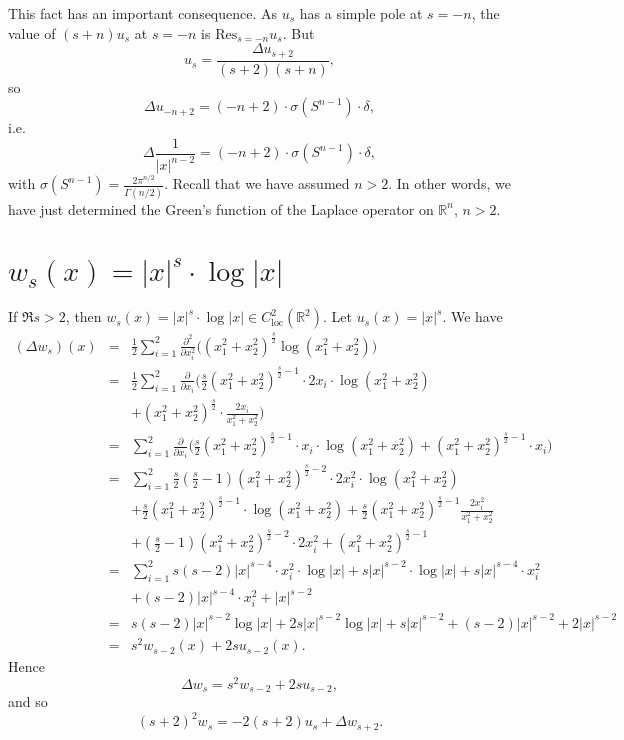 \documentclass{article}
\newcommand{\Res}{\textrm{Res}}
\begin{document}
This fact has an important consequence. As $u_s$ has a simple pole at $s=-n$, the value of $(s+n)u_s$ at $s=-n$ is $\Res_{s=-n} u_s$. 
But 
\[
u_s = \frac{\Delta u_{s+2}}{(s+2)(s+n)},
\]
so
\[
\Delta u_{-n+2}=(-n+2) \cdot \sigma(S^{n-1}) \cdot \delta,
\]
i.e.
\[
\Delta \frac{1}{|x|^{n-2}} = (-n+2) \cdot \sigma(S^{n-1}) \cdot \delta,
\]
with $\sigma(S^{n-1})=\frac{2\pi^{n/2}}{\Gamma(n/2)}$. Recall that we have assumed $n>2$.
In other words, we have just determined the Green's function of the Laplace operator on $\mathbb{R}^n$, $n>2$.



\section{$w_s(x)=|x|^s \cdot \log|x|$}
If $\Re s > 2$, then $w_s(x)=|x|^s \cdot \log|x| \in C^2_{\textrm{loc}}(\mathbb{R}^2)$. Let $u_s(x)=|x|^s$. 
We have
\begin{eqnarray*}
(\Delta w_s)(x)&=&\frac{1}{2}\sum_{i=1}^2 \frac{\partial^2}{\partial x_i^2}\Big( (x_1^2+x_2^2)^{\frac{s}{2}} \log ( x_1^2+x_2^2)\Big)\\
&=&\frac{1}{2}\sum_{i=1}^2 \frac{\partial}{\partial x_i}\Big( \frac{s}{2}(x_1^2+x_2^2)^{\frac{s}{2}-1} \cdot 2x_i \cdot \log ( x_1^2+x_2^2)\\
&&+(x_1^2+x_2^2)^{\frac{s}{2}} \cdot \frac{2x_i}{x_1^2+x_2^2} \Big)\\
&=&\sum_{i=1}^2  \frac{\partial}{\partial x_i}\Big( \frac{s}{2} (x_1^2+x_2^2)^{\frac{s}{2}-1} \cdot x_i \cdot \log ( x_1^2+x_2^2)+(x_1^2+x_2^2)^{\frac{s}{2}-1}\cdot x_i \Big)\\
&=&\sum_{i=1}^2 \frac{s}{2}\left(\frac{s}{2}-1\right)(x_1^2+x_2^2)^{\frac{s}{2}-2}  \cdot 2x_i^2 \cdot \log ( x_1^2+x_2^2)\\
&&+\frac{s}{2} (x_1^2+x_2^2)^{\frac{s}{2}-1} \cdot \log ( x_1^2+x_2^2)
+\frac{s}{2} (x_1^2+x_2^2)^{\frac{s}{2}-1} \frac{ 2x_i^2}{x_1^2+x_2^2}\\
&&+\left(\frac{s}{2}-1\right)(x_1^2+x_2^2)^{\frac{s}{2}-2}\cdot 2x_i^2 + (x_1^2+x_2^2)^{\frac{s}{2}-1}\\
&=&\sum_{i=1}^2 s(s-2) |x|^{s-4} \cdot x_i^2 \cdot \log |x|+s|x|^{s-2} \cdot \log|x|+s|x|^{s-4} \cdot x_i^2\\
&&+(s-2)|x|^{s-4}\cdot x_i^2+|x|^{s-2}\\
&=&s(s-2)|x|^{s-2} \log|x| + 2s|x|^{s-2} \log|x|+s|x|^{s-2}+(s-2)|x|^{s-2}+2|x|^{s-2}\\
&=&s^2 w_{s-2}(x)+2su_{s-2}(x).
\end{eqnarray*}
Hence
\[
\Delta w_s = s^2 w_{s-2}+2s u_{s-2},
\]
and so
\[
(s+2)^2w_s=-2(s+2) u_s + \Delta w_{s+2}.
\]
\end{document}
